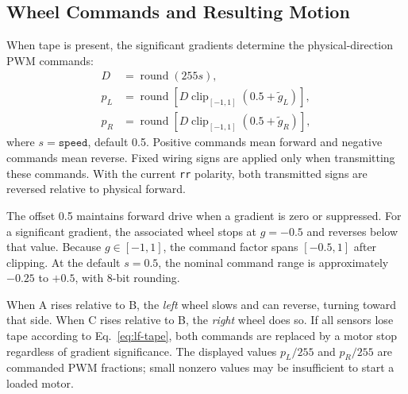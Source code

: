 \subsection{Wheel Commands and Resulting Motion}
When tape is present, the significant gradients determine the physical-direction PWM commands:
\begin{align}
D&=\operatorname{round}(255s),\\
p_L&=\operatorname{round}\!\left[D\operatorname{clip}_{[-1,1]}(0.5+\widetilde g_L)\right],\\
p_R&=\operatorname{round}\!\left[D\operatorname{clip}_{[-1,1]}(0.5+\widetilde g_R)\right],
\label{eq:lf-wheel-law}
\end{align}
where $s=\texttt{speed}$, default 0.5. Positive commands mean forward and negative commands mean reverse. Fixed wiring signs are applied only when transmitting these commands. With the current \texttt{rr} polarity, both transmitted signs are reversed relative to physical forward.

The offset 0.5 maintains forward drive when a gradient is zero or suppressed. For a significant gradient, the associated wheel stops at $g=-0.5$ and reverses below that value. Because $g\in[-1,1]$, the command factor spans $[-0.5,1]$ after clipping. At the default $s=0.5$, the nominal command range is approximately $-0.25$ to $+0.5$, with 8-bit rounding.

When A rises relative to B, the \emph{left} wheel slows and can reverse, turning toward that side. When C rises relative to B, the \emph{right} wheel does so. If all sensors lose tape according to Eq.~\eqref{eq:lf-tape}, both commands are replaced by a motor stop regardless of gradient significance. The displayed values $p_L/255$ and $p_R/255$ are commanded PWM fractions; small nonzero values may be insufficient to start a loaded motor.

